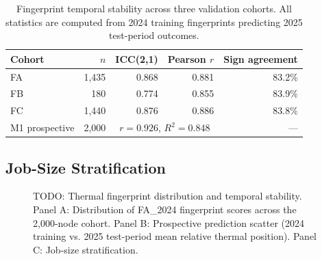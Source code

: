 
\begin{table}[t]
\caption{Fingerprint temporal stability across three validation cohorts.
All statistics are computed from 2024 training fingerprints predicting
2025 test-period outcomes.}
\label{tab:stability}
\centering
\begin{tabular}{lrrrr}
\toprule
Cohort & $n$ & ICC(2,1) & Pearson $r$ & Sign agreement \\
\midrule
FA & 1{,}435 & 0.868 & 0.881 & 83.2\% \\
FB & 180   & 0.774 & 0.855 & 83.9\% \\
FC & 1{,}440 & 0.876 & 0.886 & 83.8\% \\
\midrule
M1 prospective & 2{,}000 & \multicolumn{2}{c}{$r=0.926$, $R^2=0.848$} & --- \\
\bottomrule
\end{tabular}
\end{table}

\subsection{Job-Size Stratification}

\begin{figure}[t]
\centering
\caption{TODO: Thermal fingerprint distribution and temporal stability.
Panel A: Distribution of FA\_2024 fingerprint scores across the 2{,}000-node
cohort. Panel B: Prospective prediction scatter (2024 training vs. 2025
test-period mean relative thermal position). Panel C: Job-size stratification.}
\label{fig:fingerprints}
\end{figure}
